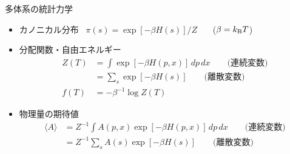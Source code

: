 
\begin{frame}[t,fragile]{多体系の統計力学}
  \begin{itemize}
  \item カノニカル分布 \ $\pi(s) = \exp [- \beta H(s) ] / Z$ \ \ \ ($\beta = k_{\rm B} T$)
  \item 分配関数・自由エネルギー
    \begin{align*}
      Z(T) &= \int \exp [- \beta H(p,x) ] \, dp \, dx \qquad \text{(連続変数)} \\
      &= \sum_s \exp [- \beta H(s) ] \qquad \text{(離散変数)} \\
      f(T) &= - \beta^{-1} \log Z(T)
    \end{align*}
  \item 物理量の期待値
    \begin{align*}
      \langle A \rangle &= Z^{-1} \int A(p,x) \exp [- \beta H(p,x) ] \, dp \, dx \qquad \text{(連続変数)} \\
      &= Z^{-1} \sum_s A(s) \exp [- \beta H(s) ] \qquad \text{(離散変数)}
    \end{align*}
  \end{itemize}
\end{frame}
